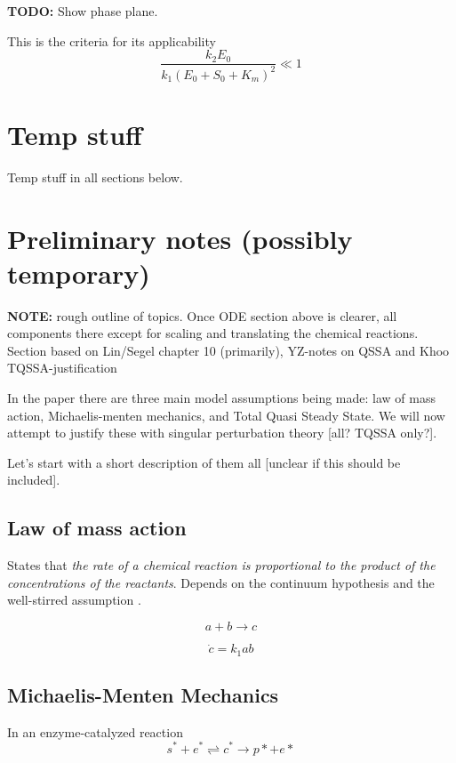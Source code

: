 \documentclass[12pt]{report}
\begin{document}
\textbf{TODO:} Show phase plane.


This is the criteria for its applicability
\begin{equation}
\frac{k_2 E_0}{k_1(E_0+S_0+K_m)^2} \ll 1
\end{equation}

\section{Temp stuff}
Temp stuff in all sections below.

\section{Preliminary notes (possibly temporary)}

\textbf{NOTE:} rough outline of topics. Once ODE section above is
clearer, all components there except for scaling and translating the
chemical reactions.  Section based on Lin/Segel chapter 10
(primarily), YZ-notes on QSSA and Khoo TQSSA-justification

In the paper there are three main model assumptions being made: law of
mass action, Michaelis-menten mechanics, and Total Quasi Steady
State. We will now attempt to justify these with singular perturbation
theory [all? TQSSA only?].

Let's start with a short description of them all [unclear if this should be included].

\subsection{Law of mass action}

States that \textit{the rate of a chemical reaction is proportional to the
product of the concentrations of the reactants}. Depends on the continuum
hypothesis and the well-stirred assumption \cite{Ingalls}.

\begin{equation}
a+b \rightarrow c
\end{equation}

\begin{equation}
\dot{c} = k_1 ab
\end{equation}

\subsection{Michaelis-Menten Mechanics}

In an enzyme-catalyzed reaction $$ s^* + e^* \rightleftharpoons
c^* \rightarrow p*+e* $$
\end{document}
